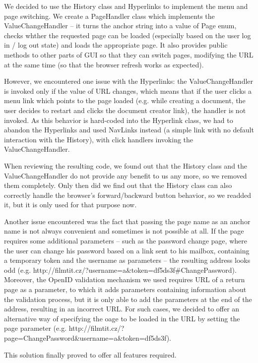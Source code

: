 We decided to use the History class and Hyperlinks to implement the menu and page switching. We create a PageHandler class which implements the ValueChangeHandler -- it turns the anchor string into a value of Page enum, checks whther the requested page can be loaded (especially based on the user log in / log out state) and loads the appropriate page. It also provides public methods to other parts of GUI so that they can switch pages, modifying the URL at the same time (so that the browser refresh works as expected).

However, we encountered one issue with the Hyperlinks: the ValueChangeHandler is invoked only if the value of URL changes, which means that if the user clicks a menu link which points to the page loaded (e.g. while creating a document, the user decides to restart and clicks the document creator link), the handler is not invoked. As this behavior is hard-coded into the Hyperlink class, we had to abandon the Hyperlinks and used NavLinks instead (a simple link with no default interaction with the History), with click handlers invoking the ValueChangeHandler.

When reviewing the resulting code, we found out that the History class and the ValueChangeHandler do not provide any benefit to us any more, so we removed them completely. Only then did we find out that the History class can also correctly handle the browser's forward/backward button behavior, so we readded it, but it is only used for that purpose now.

Another issue encountered was the fact that passing the page name as an anchor name is not always convenient and sometimes is not possible at all. If the page requires some additional parameters -- such as the password change page, where the user can change his password based on a link sent to his mailbox, containing a temporary token and the username as parameters -- the resulting address looks odd (e.g. http://filmtit.cz/?username=a\&token=df5ds3f\#ChangePassword). Moreover, the OpenID validation mechanism we used requires URL of a return page as a parameter, to which it adds parameters containing information about the validation process, but it is only able to add the parameters at the end of the address, resulting in an incorrect URL. For such cases, we decided to offer an alternative way of specifying the oage to be loaded in the URL by setting the page parameter (e.g. http://filmtit.cz/?page=ChangePassword\&username=a\&token=df5ds3f).

This solution finally proved to offer all features required.

